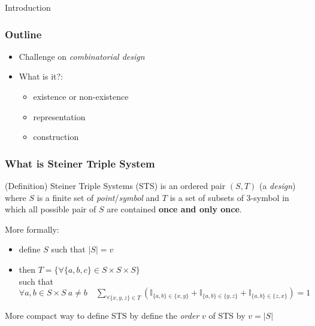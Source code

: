 	\begin{frame}[plain,c]
		\begin{center}
			\huge Introduction
		\end{center}
	\end{frame}


	\begin{frame}
		\frametitle{Outline}
		\begin{itemize}
			\item Challenge on \textit{combinatorial design}%
			\item What is it?:
			\begin{itemize}
				\item existence or non-existence
				\item representation
				\item construction
			\end{itemize}
		\end{itemize}
	\end{frame}

	\begin{frame}
		\frametitle{What is Steiner Triple System }
		\begin{block}{(Definition) Steiner Triple Systems (STS)}
			is an ordered pair $(S,T)$ (a \textit{design}) where $S$ is a finite set of \textit{point}/\textit{symbol} and $T$ is a set of subsets of 3-symbol in which all possible pair of $S$ are contained \textbf{once and only once}.\\
			 
		\end{block}
	
	\pause
	
	More formally:\\
	\begin{itemize}
		\item define $S$ such that $|S|=v$
		\item 	then $T = \{ \forall \{a,b,c\} \in S\times S \times S\}$\\
		 such that $\forall a,b \in S \times S \ a \not = b  \quad \sum_{ \forall \{x,y,z\} \in T} (\mathbb{I}_{ \{ a,b \} \in \{x,y\} }  + \mathbb{I}_{ \{ a,b \} \in \{y,z\} } +\mathbb{I}_{ \{ a,b \} \in \{z,x\}  }) = 1 $
	\end{itemize}
	More compact way to define STS by define the \textit{order} $v$ of STS by $v = |S|$
	\end{frame}

